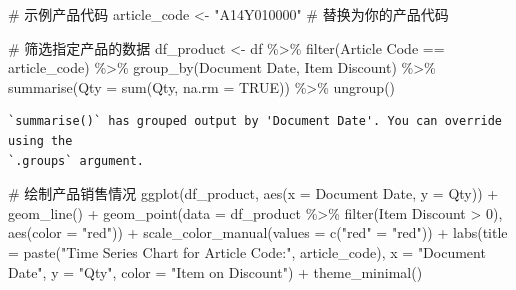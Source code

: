 \documentclass[
  letterpaper,
  DIV=11,
  numbers=noendperiod]{scrartcl}
\newenvironment{Shaded}{\begin{snugshade}}{\end{snugshade}}
\newcommand{\AttributeTok}[1]{\textcolor[rgb]{0.40,0.45,0.13}{#1}}
\newcommand{\CommentTok}[1]{\textcolor[rgb]{0.37,0.37,0.37}{#1}}
\newcommand{\ConstantTok}[1]{\textcolor[rgb]{0.56,0.35,0.01}{#1}}
\newcommand{\DecValTok}[1]{\textcolor[rgb]{0.68,0.00,0.00}{#1}}
\newcommand{\FunctionTok}[1]{\textcolor[rgb]{0.28,0.35,0.67}{#1}}
\newcommand{\NormalTok}[1]{\textcolor[rgb]{0.00,0.23,0.31}{#1}}
\newcommand{\OtherTok}[1]{\textcolor[rgb]{0.00,0.23,0.31}{#1}}
\newcommand{\SpecialCharTok}[1]{\textcolor[rgb]{0.37,0.37,0.37}{#1}}
\newcommand{\StringTok}[1]{\textcolor[rgb]{0.13,0.47,0.30}{#1}}
\begin{document}
\begin{Shaded}
\begin{Highlighting}[]
\CommentTok{\# 示例产品代码}
\NormalTok{article\_code }\OtherTok{\textless{}{-}} \StringTok{"A14Y010000"}  \CommentTok{\# 替换为你的产品代码}

\CommentTok{\# 筛选指定产品的数据}
\NormalTok{df\_product }\OtherTok{\textless{}{-}}\NormalTok{ df }\SpecialCharTok{\%\textgreater{}\%}
  \FunctionTok{filter}\NormalTok{(}\StringTok{\textasciigrave{}}\AttributeTok{Article Code}\StringTok{\textasciigrave{}} \SpecialCharTok{==}\NormalTok{ article\_code) }\SpecialCharTok{\%\textgreater{}\%}
  \FunctionTok{group\_by}\NormalTok{(}\StringTok{\textasciigrave{}}\AttributeTok{Document Date}\StringTok{\textasciigrave{}}\NormalTok{, }\StringTok{\textasciigrave{}}\AttributeTok{Item Discount}\StringTok{\textasciigrave{}}\NormalTok{) }\SpecialCharTok{\%\textgreater{}\%}
  \FunctionTok{summarise}\NormalTok{(}\AttributeTok{Qty =} \FunctionTok{sum}\NormalTok{(Qty, }\AttributeTok{na.rm =} \ConstantTok{TRUE}\NormalTok{)) }\SpecialCharTok{\%\textgreater{}\%}
  \FunctionTok{ungroup}\NormalTok{()}
\end{Highlighting}
\end{Shaded}

\begin{verbatim}
`summarise()` has grouped output by 'Document Date'. You can override using the
`.groups` argument.
\end{verbatim}

\begin{Shaded}
\begin{Highlighting}[]
\CommentTok{\# 绘制产品销售情况}
\FunctionTok{ggplot}\NormalTok{(df\_product, }\FunctionTok{aes}\NormalTok{(}\AttributeTok{x =} \StringTok{\textasciigrave{}}\AttributeTok{Document Date}\StringTok{\textasciigrave{}}\NormalTok{, }\AttributeTok{y =}\NormalTok{ Qty)) }\SpecialCharTok{+}
  \FunctionTok{geom\_line}\NormalTok{() }\SpecialCharTok{+}
  \FunctionTok{geom\_point}\NormalTok{(}\AttributeTok{data =}\NormalTok{ df\_product }\SpecialCharTok{\%\textgreater{}\%} \FunctionTok{filter}\NormalTok{(}\StringTok{\textasciigrave{}}\AttributeTok{Item Discount}\StringTok{\textasciigrave{}} \SpecialCharTok{\textgreater{}} \DecValTok{0}\NormalTok{), }\FunctionTok{aes}\NormalTok{(}\AttributeTok{color =} \StringTok{"red"}\NormalTok{)) }\SpecialCharTok{+}
  \FunctionTok{scale\_color\_manual}\NormalTok{(}\AttributeTok{values =} \FunctionTok{c}\NormalTok{(}\StringTok{"red"} \OtherTok{=} \StringTok{"red"}\NormalTok{)) }\SpecialCharTok{+}
  \FunctionTok{labs}\NormalTok{(}\AttributeTok{title =} \FunctionTok{paste}\NormalTok{(}\StringTok{"Time Series Chart for Article Code:"}\NormalTok{, article\_code),}
       \AttributeTok{x =} \StringTok{"Document Date"}\NormalTok{, }\AttributeTok{y =} \StringTok{"Qty"}\NormalTok{,}
       \AttributeTok{color =} \StringTok{"Item on Discount"}\NormalTok{) }\SpecialCharTok{+}
  \FunctionTok{theme\_minimal}\NormalTok{()}
\end{Highlighting}
\end{Shaded}
\end{document}
